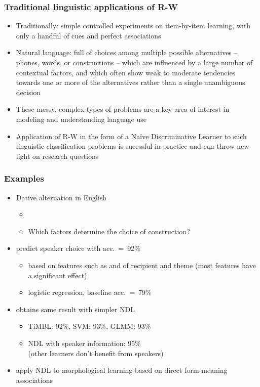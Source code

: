 \documentclass[t]{beamer} %
\begin{document}
\begin{frame}
  \frametitle{Traditional \vs linguistic applications of R-W}

  \begin{itemize}
  \item Traditionally: simple controlled experiments on item-by-item
    learning, with only a handful of cues and perfect associations
  \item Natural language: full of choices among multiple possible alternatives
    -- phones, words, or constructions -- which are influenced by a large
    number of contextual factors, and which often show weak to moderate 
    tendencies towards one or more of the alternatives rather than a
    single unambiguous decision
  \item These messy, complex types of problems are a key area of interest in
    modeling and understanding language use
  \item Application of R-W in the form of a Naïve Discriminative Learner to
    such linguistic classification problems is sucessful in practice and can 
    throw new light on research questions
  \end{itemize}
\end{frame}

\begin{frame}
  \frametitle{Examples}

  \begin{itemize}
  \item Dative alternation in English
    \begin{itemize}
    \item \textcite{Mary gave John the book} \vs \textcite{Mary gave the book to John}
    \item Which factors determine the choice of construction?
    \end{itemize}
  \item<2-> \citet{Bresnan:etc:07} predict speaker choice with acc.~=~92\%
    \begin{itemize}
    \item based on features such as  and  of recipient and theme (most features have a significant effect)
    \item logistic regression, baseline acc.~=~79\%
    \end{itemize}
  \item<3-> \citet{Baayen:11} obtains same result with simpler NDL
    \begin{itemize}
    \item TiMBL: 92\%, SVM: 93\%, GLMM: 93\%
    \item NDL with speaker information: 95\%\\
      (other learners don't benefit from speakers)
    \end{itemize}
  \item<4-> \citet{Baayen:etc:11} apply NDL to morphological learning based on direct form-meaning associations
  \end{itemize}
\end{frame}
\end{document}
